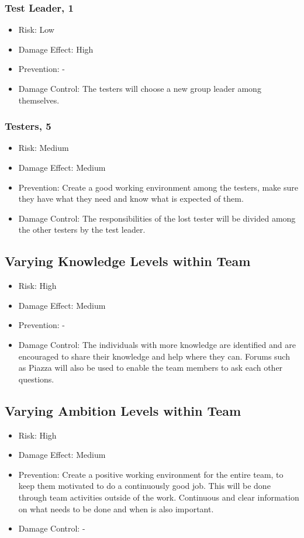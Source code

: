 \documentclass[a4paper]{article}
\begin{document}
\subsubsection{Test Leader, 1}
\begin{itemize}
\item Risk: Low
\item Damage Effect: High
\item Prevention: -
\item Damage Control: The testers will choose a new group leader among themselves.
\end{itemize}

\subsubsection{Testers, 5}
\begin{itemize}
\item Risk: Medium
\item Damage Effect: Medium
\item Prevention: Create a good working environment among the testers, make sure they have what they need and know what is expected of them.
\item Damage Control: The responsibilities of the lost tester will be divided among the other testers by the test leader.
\end{itemize}

\subsection{Varying Knowledge Levels within Team}
\begin{itemize}
\item Risk: High
\item Damage Effect: Medium
\item Prevention: -
\item Damage Control: The individuals with more knowledge are identified and are encouraged to share their knowledge and help where they can. Forums such as Piazza will also be used to enable the team members to ask each other questions. 
\end{itemize}

\subsection{Varying Ambition Levels within Team}
\begin{itemize}
\item Risk: High
\item Damage Effect: Medium
\item Prevention: Create a positive working environment for the entire team, to keep them motivated to do a continuously good job. This will be done through team activities outside of the work. Continuous and clear information on what needs to be done and when is also important.
\item Damage Control: - 
\end{itemize}
\end{document}
